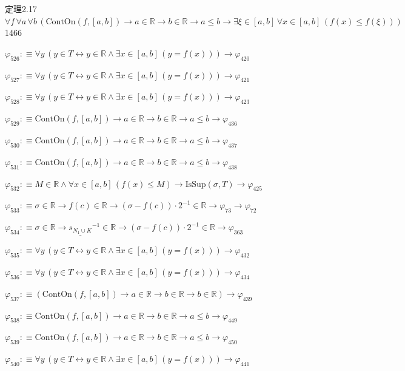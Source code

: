 \begin{fullproof}{定理2.17}{$\forall f\,\forall a\,\forall b\,(\mathrm{ContOn}(f,[a,b]) \to a \in \mathbb{R} \to b \in \mathbb{R} \to a \leq b \to \exists \xi \in [a,b]\,\forall x \in [a,b]\,(f(x) \leq f(\xi)))$}{1466}
\begin{abbrevlist}
\item $\varphi_{526} :\equiv \forall y\,(y \in T \leftrightarrow y \in \mathbb{R} \land \exists x \in [a,b]\,(y = f(x))) \to \varphi_{420}$
\item $\varphi_{527} :\equiv \forall y\,(y \in T \leftrightarrow y \in \mathbb{R} \land \exists x \in [a,b]\,(y = f(x))) \to \varphi_{421}$
\item $\varphi_{528} :\equiv \forall y\,(y \in T \leftrightarrow y \in \mathbb{R} \land \exists x \in [a,b]\,(y = f(x))) \to \varphi_{423}$
\item $\varphi_{529} :\equiv \mathrm{ContOn}(f,[a,b]) \to a \in \mathbb{R} \to b \in \mathbb{R} \to a \leq b \to \varphi_{436}$
\item $\varphi_{530} :\equiv \mathrm{ContOn}(f,[a,b]) \to a \in \mathbb{R} \to b \in \mathbb{R} \to a \leq b \to \varphi_{437}$
\item $\varphi_{531} :\equiv \mathrm{ContOn}(f,[a,b]) \to a \in \mathbb{R} \to b \in \mathbb{R} \to a \leq b \to \varphi_{438}$
\item $\varphi_{532} :\equiv M \in \mathbb{R} \land \forall x \in [a,b]\,(f(x) \leq M) \to \mathrm{IsSup}(\sigma,T) \to \varphi_{425}$
\item $\varphi_{533} :\equiv \sigma \in \mathbb{R} \to f(c) \in \mathbb{R} \to (\sigma - f(c)) \cdot 2^{-1} \in \mathbb{R} \to \varphi_{73} \to \varphi_{72}$
\item $\varphi_{534} :\equiv \sigma \in \mathbb{R} \to \underline{s_{N_{1} \cup K}}^{-1} \in \mathbb{R} \to (\sigma - f(c)) \cdot 2^{-1} \in \mathbb{R} \to \varphi_{363}$
\item $\varphi_{535} :\equiv \forall y\,(y \in T \leftrightarrow y \in \mathbb{R} \land \exists x \in [a,b]\,(y = f(x))) \to \varphi_{432}$
\item $\varphi_{536} :\equiv \forall y\,(y \in T \leftrightarrow y \in \mathbb{R} \land \exists x \in [a,b]\,(y = f(x))) \to \varphi_{434}$
\item $\varphi_{537} :\equiv (\mathrm{ContOn}(f,[a,b]) \to a \in \mathbb{R} \to b \in \mathbb{R} \to b \in \mathbb{R}) \to \varphi_{439}$
\item $\varphi_{538} :\equiv \mathrm{ContOn}(f,[a,b]) \to a \in \mathbb{R} \to b \in \mathbb{R} \to a \leq b \to \varphi_{449}$
\item $\varphi_{539} :\equiv \mathrm{ContOn}(f,[a,b]) \to a \in \mathbb{R} \to b \in \mathbb{R} \to a \leq b \to \varphi_{450}$
\item $\varphi_{540} :\equiv \forall y\,(y \in T \leftrightarrow y \in \mathbb{R} \land \exists x \in [a,b]\,(y = f(x))) \to \varphi_{441}$

\end{abbrevlist}
\end{fullproof}
